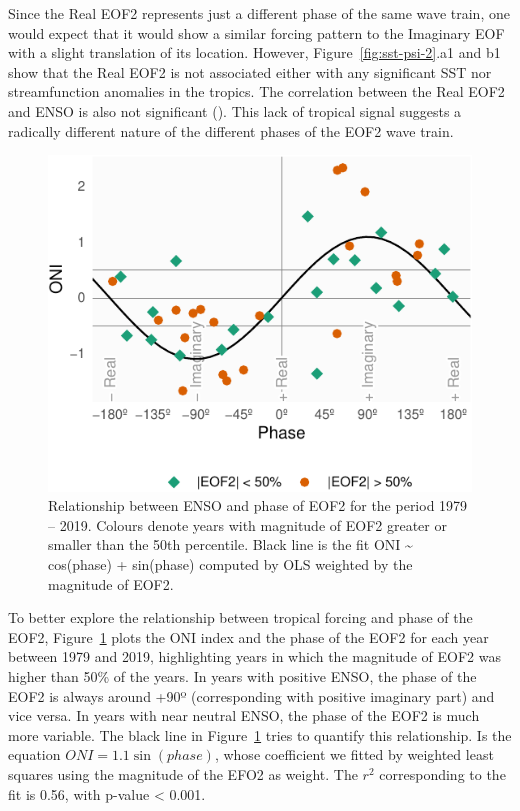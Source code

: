 \documentclass[smallextended]{svjour3}       %
\begin{document}
Since the Real EOF2 represents just a different phase of the same wave train, one would expect that it would show a similar forcing pattern to the Imaginary EOF with a slight translation of its location. However, Figure~\ref{fig:sst-psi-2}.a1 and b1 show that the Real EOF2 is not associated either with any significant SST nor streamfunction anomalies in the tropics. The correlation between the Real EOF2 and ENSO is also not significant (). This lack of tropical signal suggests a radically different nature of the different phases of the EOF2 wave train.

\begin{figure}
\centering
\includegraphics{../figures/enso-phase-1.pdf}
\caption{\label{fig:enso-phase}Relationship between ENSO and phase of EOF2 for the period 1979 -- 2019. Colours denote years with magnitude of EOF2 greater or smaller than the 50th percentile. Black line is the fit ONI \textasciitilde{} cos(phase) + sin(phase) computed by OLS weighted by the magnitude of EOF2.}
\end{figure}

To better explore the relationship between tropical forcing and phase of the EOF2, Figure~\ref{fig:enso-phase} plots the ONI index and the phase of the EOF2 for each year between 1979 and 2019, highlighting years in which the magnitude of EOF2 was higher than 50\% of the years. In years with positive ENSO, the phase of the EOF2 is always around +90º (corresponding with positive imaginary part) and vice versa. In years with near neutral ENSO, the phase of the EOF2 is much more variable. The black line in Figure~\ref{fig:enso-phase} tries to quantify this relationship. Is the equation \(ONI = 1.1\sin{(phase)}\), whose coefficient we fitted by weighted least squares using the magnitude of the EFO2 as weight. The \(r^2\) corresponding to the fit is 0.56, with p-value \textless{} 0.001.
\end{document}
